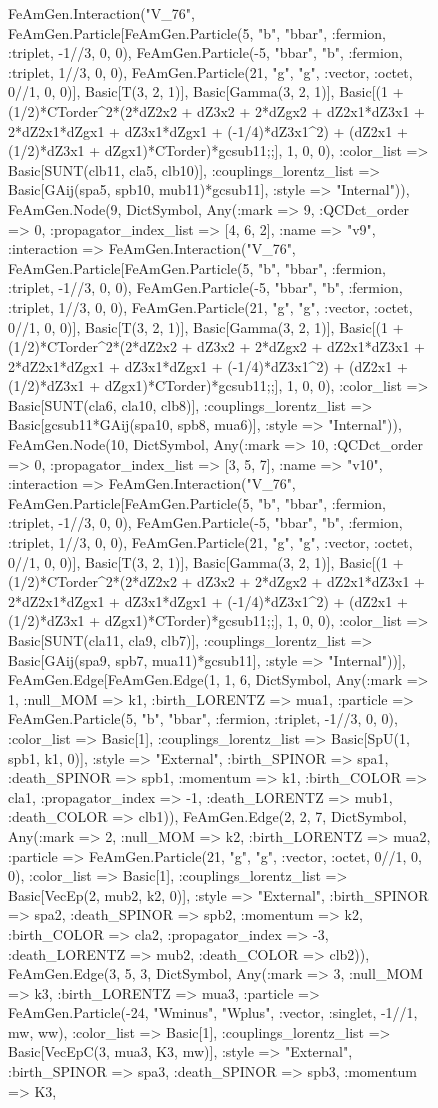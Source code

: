 \documentclass{revtex4}
\begin{document}
\begin{figure}[!htb]
\begin{center}
{FeAmGen.Interaction("V_76", FeAmGen.Particle[FeAmGen.Particle(5, "b", "bbar", :fermion, :triplet, -1//3, 0, 0), FeAmGen.Particle(-5, "bbar", "b", :fermion, :triplet, 1//3, 0, 0), FeAmGen.Particle(21, "g", "g", :vector, :octet, 0//1, 0, 0)], Basic[T(3, 2, 1)], Basic[Gamma(3, 2, 1)], Basic[(1 + (1/2)*CTorder^2*(2*dZ2x2 + dZ3x2 + 2*dZgx2 + dZ2x1*dZ3x1 + 2*dZ2x1*dZgx1 + dZ3x1*dZgx1 + (-1/4)*dZ3x1^2) + (dZ2x1 + (1/2)*dZ3x1 + dZgx1)*CTorder)*gcsub11;;], 1, 0, 0), :color_list => Basic[SUNT(clb11, cla5, clb10)], :couplings_lorentz_list => Basic[GAij(spa5, spb10, mub11)*gcsub11], :style => "Internal")), FeAmGen.Node(9, Dict{Symbol, Any}(:mark => 9, :QCDct_order => 0, :propagator_index_list => [4, 6, 2], :name => "v9", :interaction => FeAmGen.Interaction("V_76", FeAmGen.Particle[FeAmGen.Particle(5, "b", "bbar", :fermion, :triplet, -1//3, 0, 0), FeAmGen.Particle(-5, "bbar", "b", :fermion, :triplet, 1//3, 0, 0), FeAmGen.Particle(21, "g", "g", :vector, :octet, 0//1, 0, 0)], Basic[T(3, 2, 1)], Basic[Gamma(3, 2, 1)], Basic[(1 + (1/2)*CTorder^2*(2*dZ2x2 + dZ3x2 + 2*dZgx2 + dZ2x1*dZ3x1 + 2*dZ2x1*dZgx1 + dZ3x1*dZgx1 + (-1/4)*dZ3x1^2) + (dZ2x1 + (1/2)*dZ3x1 + dZgx1)*CTorder)*gcsub11;;], 1, 0, 0), :color_list => Basic[SUNT(cla6, cla10, clb8)], :couplings_lorentz_list => Basic[gcsub11*GAij(spa10, spb8, mua6)], :style => "Internal")), FeAmGen.Node(10, Dict{Symbol, Any}(:mark => 10, :QCDct_order => 0, :propagator_index_list => [3, 5, 7], :name => "v10", :interaction => FeAmGen.Interaction("V_76", FeAmGen.Particle[FeAmGen.Particle(5, "b", "bbar", :fermion, :triplet, -1//3, 0, 0), FeAmGen.Particle(-5, "bbar", "b", :fermion, :triplet, 1//3, 0, 0), FeAmGen.Particle(21, "g", "g", :vector, :octet, 0//1, 0, 0)], Basic[T(3, 2, 1)], Basic[Gamma(3, 2, 1)], Basic[(1 + (1/2)*CTorder^2*(2*dZ2x2 + dZ3x2 + 2*dZgx2 + dZ2x1*dZ3x1 + 2*dZ2x1*dZgx1 + dZ3x1*dZgx1 + (-1/4)*dZ3x1^2) + (dZ2x1 + (1/2)*dZ3x1 + dZgx1)*CTorder)*gcsub11;;], 1, 0, 0), :color_list => Basic[SUNT(cla11, cla9, clb7)], :couplings_lorentz_list => Basic[GAij(spa9, spb7, mua11)*gcsub11], :style => "Internal"))], FeAmGen.Edge[FeAmGen.Edge(1, 1, 6, Dict{Symbol, Any}(:mark => 1, :null_MOM => k1, :birth_LORENTZ => mua1, :particle => FeAmGen.Particle(5, "b", "bbar", :fermion, :triplet, -1//3, 0, 0), :color_list => Basic[1], :couplings_lorentz_list => Basic[SpU(1, spb1, k1, 0)], :style => "External", :birth_SPINOR => spa1, :death_SPINOR => spb1, :momentum => k1, :birth_COLOR => cla1, :propagator_index => -1, :death_LORENTZ => mub1, :death_COLOR => clb1)), FeAmGen.Edge(2, 2, 7, Dict{Symbol, Any}(:mark => 2, :null_MOM => k2, :birth_LORENTZ => mua2, :particle => FeAmGen.Particle(21, "g", "g", :vector, :octet, 0//1, 0, 0), :color_list => Basic[1], :couplings_lorentz_list => Basic[VecEp(2, mub2, k2, 0)], :style => "External", :birth_SPINOR => spa2, :death_SPINOR => spb2, :momentum => k2, :birth_COLOR => cla2, :propagator_index => -3, :death_LORENTZ => mub2, :death_COLOR => clb2)), FeAmGen.Edge(3, 5, 3, Dict{Symbol, Any}(:mark => 3, :null_MOM => k3, :birth_LORENTZ => mua3, :particle => FeAmGen.Particle(-24, "Wminus", "Wplus", :vector, :singlet, -1//1, mw, ww), :color_list => Basic[1], :couplings_lorentz_list => Basic[VecEpC(3, mua3, K3, mw)], :style => "External", :birth_SPINOR => spa3, :death_SPINOR => spb3, :momentum => K3, }
\end{center}
\end{figure}
\end{document}

